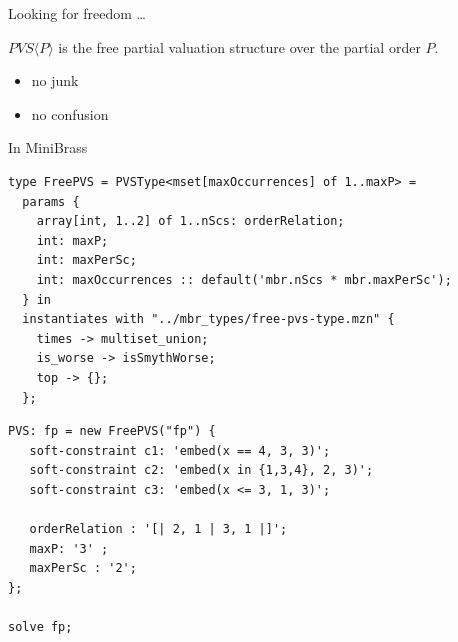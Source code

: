 \begin{frame}{Looking for freedom \ldots}
\begin{lemma}
$\mathit{PVS}\langle P \rangle$ is the free partial valuation structure over the partial order $P$.
\end{lemma}


\begin{center}
\end{center}


\begin{itemize}
\item no junk
\item no confusion
\end{itemize}
\end{frame}

\begin{frame}[fragile]{In MiniBrass}
\begin{lstlisting}
type FreePVS = PVSType<mset[maxOccurrences] of 1..maxP> = 
  params { 
    array[int, 1..2] of 1..nScs: orderRelation;
    int: maxP;
    int: maxPerSc;
    int: maxOccurrences :: default('mbr.nScs * mbr.maxPerSc');
  } in 
  instantiates with "../mbr_types/free-pvs-type.mzn" {
    times -> multiset_union;
    is_worse -> isSmythWorse;
    top -> {};
  };
\end{lstlisting}

\begin{lstlisting}
PVS: fp = new FreePVS("fp") {
   soft-constraint c1: 'embed(x == 4, 3, 3)';
   soft-constraint c2: 'embed(x in {1,3,4}, 2, 3)';
   soft-constraint c3: 'embed(x <= 3, 1, 3)';
   
   orderRelation : '[| 2, 1 | 3, 1 |]';
   maxP: '3' ;
   maxPerSc : '2';
}; 

solve fp;
\end{lstlisting}
\end{frame}

